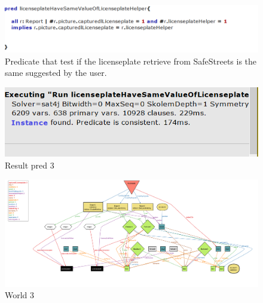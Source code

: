 \begin{figure}
	\centering
	\includegraphics[width=0.9\linewidth, height=0.15\textheight]{Images/Alloy/predworld31}
	\caption{Predicate that test if the licenseplate retrieve from SafeStreets is the same suggested by the user.}
	\label{Pred 3}
\end{figure}

\begin{figure}
	\centering
	\includegraphics[width=0.8\linewidth, height=0.11\textheight]{Images/Alloy/predworld32}
	\caption{Result pred 3}
	\label{Result pred 3}
\end{figure}


\begin{figure}
	\centering
	\includegraphics[width=1.1\linewidth, height=0.55\textheight]{Images/Alloy/world3alloy}
	\caption{World 3}
	\label{World3}
\end{figure}

